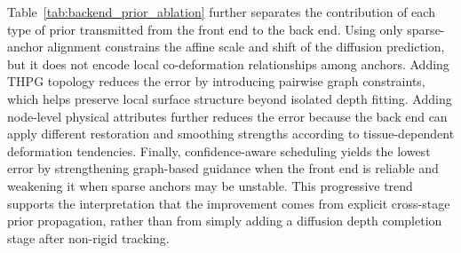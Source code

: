 \documentclass[pdflatex,sn-mathphys-num]{sn-jnl}
\begin{document}
Table~\ref{tab:backend_prior_ablation} further separates the contribution of each type of prior transmitted from the front end to the back end. Using only sparse-anchor alignment constrains the affine scale and shift of the diffusion prediction, but it does not encode local co-deformation relationships among anchors. Adding THPG topology reduces the error by introducing pairwise graph constraints, which helps preserve local surface structure beyond isolated depth fitting. Adding node-level physical attributes further reduces the error because the back end can apply different restoration and smoothing strengths according to tissue-dependent deformation tendencies. Finally, confidence-aware scheduling yields the lowest error by strengthening graph-based guidance when the front end is reliable and weakening it when sparse anchors may be unstable. This progressive trend supports the interpretation that the improvement comes from explicit cross-stage prior propagation, rather than from simply adding a diffusion depth completion stage after non-rigid tracking.

\begin{table}[t]
\caption{Energy-term ablation of the back-end objective on representative dense depth completion sequences. Each variant removes only one term from Eq.~(\ref{eq:eback}) while keeping the other terms and the same DDIM test-time optimization settings unchanged.}
\label{tab:energy_ablation}
\centering
\small
\setlength{\tabcolsep}{4pt}
\renewcommand{\arraystretch}{1.12}
\end{table}
\end{document}
